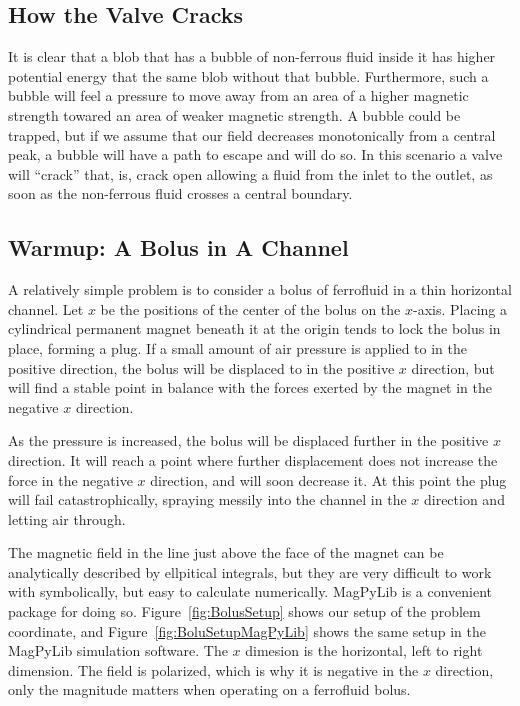\documentclass{asme2ej}
\begin{document}
\subsection{How the Valve Cracks}

It is clear that a blob that has a bubble of non-ferrous fluid inside it
has higher potential energy that the same blob without that bubble.
Furthermore, such a bubble will feel a pressure to move away from
an area of a higher magnetic strength towared an area of weaker magnetic
strength. A bubble could be trapped, but if we assume that our
field decreases monotonically from a central peak, a bubble
will have a path to escape and will do so.
In this scenario a valve will ``crack'' that, is, crack open
allowing a fluid from the inlet to the outlet, as soon as the
non-ferrous fluid crosses a central boundary.


\subsection{Warmup: A Bolus in A Channel}

A relatively simple problem is to consider a bolus of
ferrofluid in a thin horizontal channel. Let $x$ be the positions of the center of
the bolus on the $x$-axis.
Placing a cylindrical permanent
magnet beneath it at the origin tends to lock the bolus in place,
forming a plug.
If a small amount of air pressure is applied to in the positive direction,
the bolus will
be displaced to in the positive $x$ direction, but will find a
stable point in balance with the forces exerted by the magnet in
the negative $x$ direction.

As the pressure is increased, the bolus will be displaced further
in the positive $x$ direction.
It will reach a point where further displacement does not increase
the force in the negative $x$ direction, and will soon decrease it.
At this point the plug will fail
catastrophically, spraying messily into the channel in the $x$ direction and letting air through.

The magnetic field in the line just above the face of the magnet can be analytically
described by ellpitical integrals, but they are very difficult to work with symbolically,
but easy to calculate numerically.
MagPyLib is a convenient package for doing so.
Figure~\ref{fig:BolusSetup} shows our setup of the problem coordinate,
and Figure~\ref{fig:BoluSetupMagPyLib} shows the same setup in the MagPyLib simulation software.
The $x$ dimesion is the horizontal, left to right dimension.
The field is polarized, which is why it is negative in the $x$ direction, only
the magnitude matters when
operating on a ferrofluid bolus.
\end{document}

